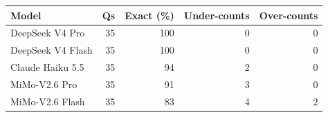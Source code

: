 \begin{tabular}{lrrrr}
\toprule
Model & Qs & Exact (\%) & Under-counts & Over-counts \\
\midrule
DeepSeek V4 Pro & 35 & 100 & 0 & 0 \\
DeepSeek V4 Flash & 35 & 100 & 0 & 0 \\
Claude Haiku 5.5 & 35 & 94 & 2 & 0 \\
MiMo-V2.6 Pro & 35 & 91 & 3 & 0 \\
MiMo-V2.6 Flash & 35 & 83 & 4 & 2 \\
\bottomrule
\end{tabular}
